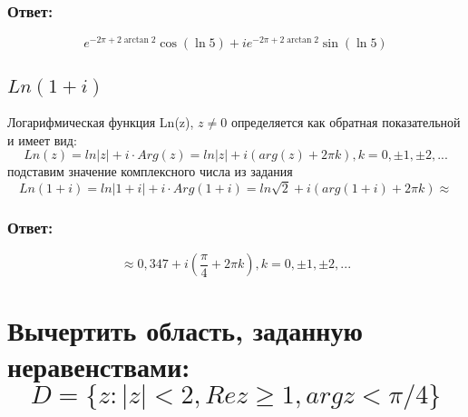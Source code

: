\documentclass[12pt]{article}
\begin{document}
\subsubsection*{Ответ:}
$$e^{-2\pi + 2\arctan 2} \cos(\ln 5) + i e^{-2\pi + 2\arctan 2} \sin(\ln 5)$$

\subsection{$Ln(1+i)$}
Логарифмическая функция Ln(z), $z \neq 0$ определяется как обратная показательной и имеет вид: $$Ln(z) = ln|z| + i\cdot Arg(z) = ln|z| + i(arg(z) + 2\pi k), k = 0, \pm 1, \pm 2, ...$$
подставим значение комплексного числа из задания\\
 $$Ln(1+i) = ln|1+i| + i\cdot Arg(1+i) = ln \sqrt{2} + i(arg(1+i) + 2\pi k) \approx$$ 
\subsubsection*{Ответ:}
$$\approx 0,347 + i(\frac{\pi}{4} + 2\pi k), k = 0, \pm 1, \pm 2, ...$$

\FloatBarrier
\section{Вычертить область, заданную неравенствами: $$D = \{z: |z|<2, Re z \geq 1, arg z < \pi/4\}$$}
\begin{center}
\end{center}
\FloatBarrier
\end{document}
